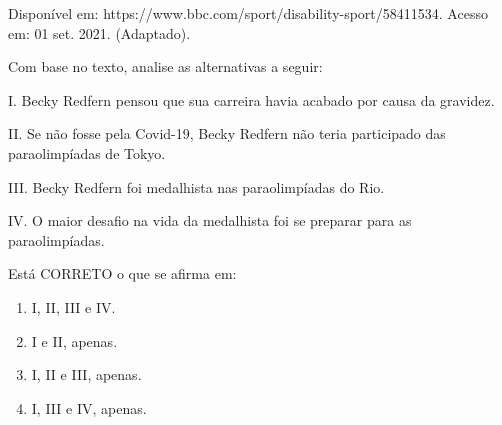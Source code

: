 Disponível em: https://www.bbc.com/sport/disability-sport/58411534. Acesso em: 01 set. 2021. (Adaptado).

Com base no texto, analise as alternativas a seguir:

\par

I. Becky Redfern pensou que sua carreira havia acabado por causa da gravidez.\par
II. Se não fosse pela Covid-19, Becky Redfern não teria participado das paraolimpíadas de Tokyo.\par
III. Becky Redfern foi medalhista nas paraolimpíadas do Rio.\par
IV. O maior desafio na vida da medalhista foi se preparar para as paraolimpíadas.

\par

Está CORRETO o que se afirma em:

\begin{enumerate}
\item I, II, III e IV.
\item I e II, apenas.
\item I, II e III, apenas.
\item I, III e IV, apenas.\end{enumerate}
